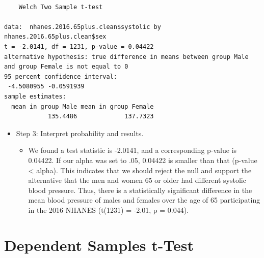 \documentclass[
  letterpaper,
  DIV=11,
  numbers=noendperiod]{scrreprt}
\newenvironment{Shaded}{\begin{snugshade}}{\end{snugshade}}
\newcommand{\FloatTok}[1]{\textcolor[rgb]{0.68,0.00,0.00}{#1}}
\newcommand{\FunctionTok}[1]{\textcolor[rgb]{0.28,0.35,0.67}{#1}}
\newcommand{\NormalTok}[1]{\textcolor[rgb]{0.00,0.23,0.31}{#1}}
\newcommand{\SpecialCharTok}[1]{\textcolor[rgb]{0.37,0.37,0.37}{#1}}
\providecommand{\tightlist}{%
  \setlength{\itemsep}{0pt}\setlength{\parskip}{0pt}}\usepackage{longtable,booktabs,array}
\begin{document}
\begin{Shaded}
\end{Shaded}

\begin{verbatim}

    Welch Two Sample t-test

data:  nhanes.2016.65plus.clean$systolic by nhanes.2016.65plus.clean$sex
t = -2.0141, df = 1231, p-value = 0.04422
alternative hypothesis: true difference in means between group Male and group Female is not equal to 0
95 percent confidence interval:
 -4.5080955 -0.0591939
sample estimates:
  mean in group Male mean in group Female 
            135.4486             137.7323 
\end{verbatim}

\begin{itemize}
\tightlist
\item
  Step 3: Interpret probability and results.

  \begin{itemize}
  \tightlist
  \item
    We found a test statistic is -2.0141, and a corresponding p-value is
    0.04422. If our alpha was set to .05, 0.04422 is smaller than that
    (p-value \textless{} alpha). This indicates that we should reject
    the null and support the alternative that the men and women 65 or
    older had different systolic blood pressure. Thus, there is a
    statistically significant difference in the mean blood pressure of
    males and females over the age of 65 participating in the 2016
    NHANES (t(1231) = -2.01, p = 0.044).
  \end{itemize}
\end{itemize}

\section{Dependent Samples t-Test}\label{dependent-samples-t-test}
\end{document}
